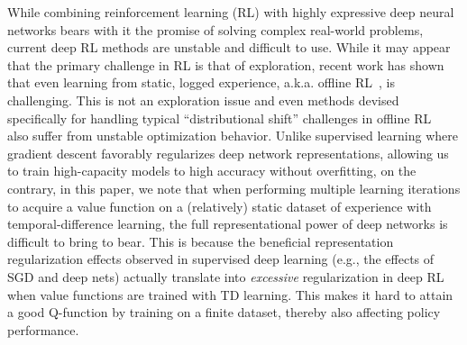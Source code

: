 \iffalse
While combining reinforcement learning (RL) with highly expressive deep neural networks bears with it the promise of solving complex real-world problems, current deep RL methods are 
unstable and difficult to use.
While it may appear that the primary challenge in RL is that of exploration, recent work has shown that even learning from static, logged experience, a.k.a. offline RL~\citep{lange2012batch,levine2020offline}, is challenging. This is not an exploration issue and even methods devised specifically for handling typical ``distributional shift'' challenges in offline RL~\citep{fujimoto2018addressing,kumar2019stabilizing,kumar2020conservative,wu2019behavior, agarwal2019optimistic} also suffer from unstable optimization behavior. Unlike supervised learning where gradient descent favorably regularizes deep network representations, allowing us to train high-capacity models to high accuracy without overfitting, on the contrary, in this paper, we note that when performing multiple learning iterations to acquire a value function on a (relatively) static dataset of experience with temporal-difference learning, the full representational power of deep networks is difficult to bring to bear. This is because the beneficial representation regularization effects observed in supervised deep learning (e.g., the effects of SGD and deep nets) actually translate into \emph{excessive} regularization in deep RL when value functions are trained with TD learning. This makes it hard to attain a good Q-function by training on a finite dataset, thereby also affecting policy performance.

